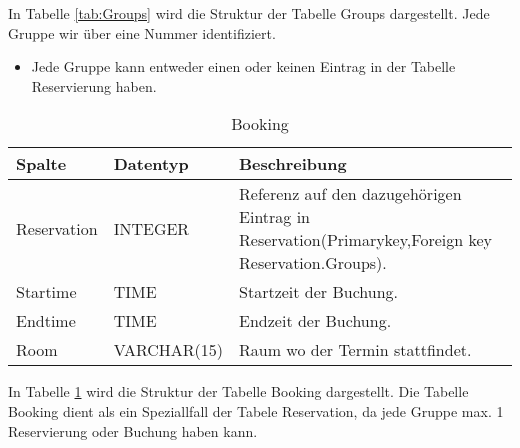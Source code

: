 In Tabelle \ref{tab:Groups} wird die Struktur der Tabelle Groups dargestellt. Jede Gruppe wir über eine Nummer identifiziert.

\begin{itemize}
	\item Jede Gruppe kann entweder einen oder keinen Eintrag in der Tabelle Reservierung haben.
\end{itemize}

\begin{table}[h]
\centering
\caption{Booking}
	\label{tab:Booking}
    \begin{tabular}{| p{2cm} | p{3cm} | p{10cm} |}
    \hline
    \rowcolor{lightgray} Spalte & Datentyp & Beschreibung  \\ \hline
    Reservation  & INTEGER & Referenz auf den dazugehörigen Eintrag in Reservation(Primarykey,Foreign key Reservation.Groups). \\ \hline
    Startime & TIME & Startzeit der Buchung. \\ \hline
    Endtime & TIME & Endzeit der Buchung. \\ \hline
    Room & VARCHAR(15) & Raum wo der Termin stattfindet. \\ \hline
    \end{tabular}
\end{table}

In Tabelle \ref{tab:Booking} wird die Struktur der Tabelle Booking dargestellt. Die Tabelle Booking dient als ein Speziallfall der Tabele Reservation, da jede Gruppe max. 1 Reservierung oder Buchung haben kann.
